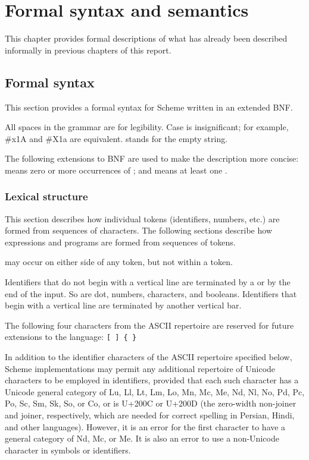 \chapter{Formal syntax and semantics}
\label{formalchapter}

This chapter provides formal descriptions of what has already been
described informally in previous chapters of this report.



\section{Formal syntax}
\label{BNF}

This section provides a formal syntax for Scheme written in an extended
BNF.

All spaces in the grammar are for legibility.  Case is insignificant;
for example, {\cf \#x1A} and {\cf \#X1a} are equivalent.  
stands for the empty string.

The following extensions to BNF are used to make the description more
concise:   means zero or more occurrences of
; and  means at least one
.


\subsection{Lexical structure}

This section describes how individual tokens (identifiers,
numbers, etc.) are formed from sequences of characters.  The following
sections describe how expressions and programs are formed from sequences
of tokens.

 may occur on either side of any token, but not
within a token.

\vest Identifiers that do not begin with a vertical line are
terminated by a  or by the end of the input.
So are dot, numbers, characters, and booleans.
Identifiers that begin with a vertical line are terminated by another vertical bar.

The following four characters from the ASCII repertoire
are reserved for future extensions to the
language: {\tt \verb"[" \verb"]" \verb"{" \verb"}"}

In addition to the identifier characters of the ASCII repertoire specified
below, Scheme implementations may permit any additional repertoire of
Unicode characters to be employed in identifiers,
provided that each such character has a Unicode general category of Lu,
Ll, Lt, Lm, Lo, Mn, Mc, Me, Nd, Nl, No, Pd, Pc, Po, Sc, Sm, Sk, So,
or Co, or is U+200C or U+200D (the zero-width non-joiner and joiner,
respectively, which are needed for correct spelling in Persian, Hindi,
and other languages).
However, it is an error for the first character to have a general category
of Nd, Mc, or Me.  It is also an error to use a non-Unicode character
in symbols or identifiers.

